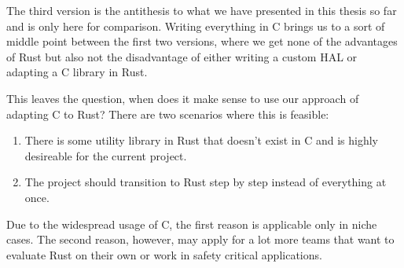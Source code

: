 The third version is the antithesis to what we have presented in this thesis so far and is only here for comparison.
Writing everything in C brings us to a sort of middle point between the first two versions, where
we get none of the advantages of Rust
but also not the disadvantage of either writing a custom HAL or adapting a C library in Rust.

This leaves the question, when does it make sense to use our approach of adapting C to Rust?
There are two scenarios where this is feasible:
\begin{enumerate}
    \item There is some utility library in Rust that doesn't exist in C and is highly desireable for the current project.
    \item The project should transition to Rust step by step instead of everything at once.
\end{enumerate}

Due to the widespread usage of C, the first reason is applicable only in niche cases.
The second reason, however, may apply for a lot more teams that want to evaluate Rust on their own or work in safety critical applications.